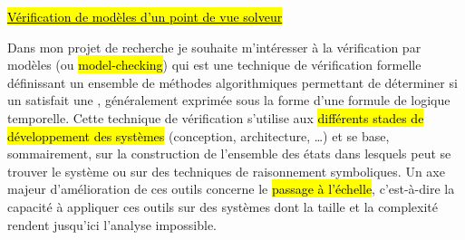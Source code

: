 \label{sec:projet_recherche}
\vspace{10pt}

\hl{\underline{Vérification de modèles d’un point de vue solveur}}
\vspace{10pt}



Dans mon projet de recherche je souhaite m'intéresser à la vérification par
modèles (ou \hl{{model-checking}}) qui est une technique de vérification
formelle définissant un ensemble de méthodes algorithmiques permettant de
déterminer si un  satisfait une , généralement exprimée sous la forme d'une formule de logique
temporelle. Cette technique de vérification s'utilise aux \hl{différents stades de
développement des systèmes} (conception, architecture, \dots) et se base,
sommairement, sur la construction de l'ensemble des états dans lesquels peut se
trouver le système ou sur des techniques de raisonnement symboliques. Un axe
majeur d'amélioration de ces outils concerne le \hl{passage à l'échelle},
c'est-à-dire la capacité à appliquer ces outils sur des systèmes dont la taille
et la complexité rendent jusqu'ici l'analyse impossible.\\

